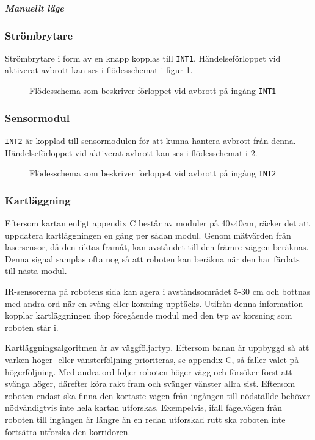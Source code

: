 \documentclass[11pt]{article}
\begin{document}
\begin{flushleft}
\textbf{\textit{Manuellt läge}}

\subsubsection {Strömbrytare}
Strömbrytare i form av en knapp kopplas till \verb+INT1+. Händelseförloppet vid aktiverat avbrott kan ses i flödesschemat i figur \ref{avbrott_strombrytare}. 

\begin{figure}[htbp]
\centering
\noindent\resizebox{.6\linewidth}{!}{
	}
	\cprotect\caption{Flödesschema som beskriver förloppet vid avbrott på ingång \verb+INT1+ \label{avbrott_strombrytare}}	
\end{figure}

\subsubsection {Sensormodul} 
\verb+INT2+ är kopplad till sensormodulen för att kunna hantera avbrott från denna. Händelseförloppet vid aktiverat avbrott kan ses i flödesschemat i \ref{avbrott_sensormodul}.

\begin{figure}[htbp]
\centering
\noindent\resizebox{1\linewidth}{!}{
	}
	\cprotect\caption{Flödesschema som beskriver förloppet vid avbrott på ingång \verb+INT2+ \label{avbrott_sensormodul}}	
\end{figure}

\subsubsection{Kartläggning}
Eftersom kartan enligt appendix C består av moduler på 40x40cm, räcker det att uppdatera kartläggningen en gång per sådan modul. Genom mätvärden från lasersensor, då den riktas framåt, kan avståndet till den främre väggen beräknas. Denna signal samplas ofta nog så att roboten kan beräkna när den har färdats till nästa modul. 

IR-sensorerna på robotens sida kan agera i avståndsområdet 5-30 cm och bottnas med andra ord när en sväng eller korsning upptäcks. Utifrån denna information kopplar kartläggningen ihop föregående modul med den typ av korsning som roboten står i. 

Kartläggningsalgoritmen är av väggföljartyp. Eftersom banan är uppbyggd så att varken höger- eller vänsterföljning prioriteras, se appendix C, så faller valet på högerföljning. Med andra ord följer roboten höger vägg och försöker först att svänga höger, därefter köra rakt fram och svänger vänster allra sist. Eftersom roboten endast ska finna den kortaste vägen från ingången till nödställde behöver nödvändigtvis inte hela kartan utforskas. Exempelvis, ifall fågelvägen från roboten till ingången är längre än en redan utforskad rutt ska roboten inte fortsätta utforska den korridoren.


\end{flushleft}
\end{document}
